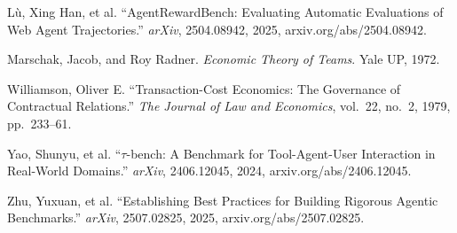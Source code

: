 \documentclass[10pt]{article}
\theoremstyle{remark}
\begin{document}
\begin{list}{}{\setlength{\itemindent}{-2em}\setlength{\leftmargin}{2em}\setlength{\itemsep}{1pt}\setlength{\parsep}{0pt}}
\item L\`u, Xing Han, et al. ``AgentRewardBench: Evaluating Automatic Evaluations of Web Agent Trajectories.'' \emph{arXiv}, 2504.08942, 2025, arxiv.org/abs/2504.08942.
\item Marschak, Jacob, and Roy Radner. \emph{Economic Theory of Teams}. Yale UP, 1972.
\item Williamson, Oliver E. ``Transaction-Cost Economics: The Governance of Contractual Relations.'' \emph{The Journal of Law and Economics}, vol.~22, no.~2, 1979, pp.~233--61.
\item Yao, Shunyu, et al. ``$\tau$-bench: A Benchmark for Tool-Agent-User Interaction in Real-World Domains.'' \emph{arXiv}, 2406.12045, 2024, arxiv.org/abs/2406.12045.
\item Zhu, Yuxuan, et al. ``Establishing Best Practices for Building Rigorous Agentic Benchmarks.'' \emph{arXiv}, 2507.02825, 2025, arxiv.org/abs/2507.02825.
\end{list}
\end{document}
